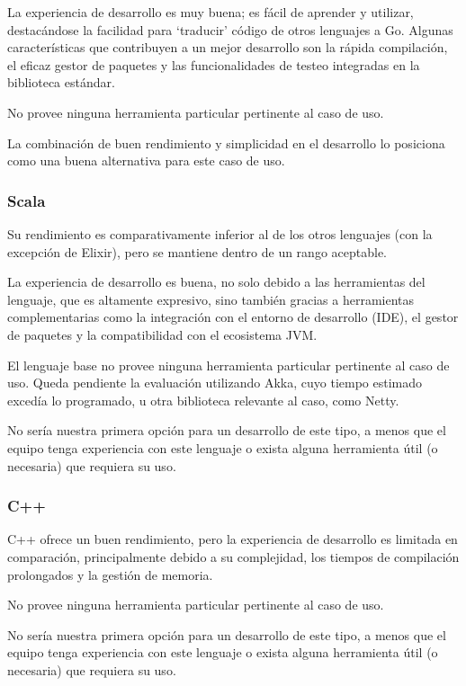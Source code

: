 \documentclass[11pt]{article}
\let\Oldsubsubsection\subsubsection
\renewcommand{\subsubsection}{\FloatBarrier\Oldsubsubsection}
\begin{document}
La experiencia de desarrollo es muy buena; es fácil de aprender y utilizar, destacándose la facilidad para `traducir' código de otros lenguajes a Go. Algunas características que contribuyen a un mejor desarrollo son la rápida compilación, el eficaz gestor de paquetes y las funcionalidades de testeo integradas en la biblioteca estándar.

No provee ninguna herramienta particular pertinente al caso de uso.

La combinación de buen rendimiento y simplicidad en el desarrollo lo posiciona como una buena alternativa para este caso de uso.

\subsubsection{Scala}

Su rendimiento es comparativamente inferior al de los otros lenguajes (con la excepción de Elixir), pero se mantiene dentro de un rango aceptable.

La experiencia de desarrollo es buena, no solo debido a las herramientas del lenguaje, que es altamente expresivo, sino también gracias a herramientas complementarias como la integración con el entorno de desarrollo (IDE), el gestor de paquetes y la compatibilidad con el ecosistema JVM.

El lenguaje base no provee ninguna herramienta particular pertinente al caso de uso. Queda pendiente la evaluación utilizando Akka, cuyo tiempo estimado excedía lo programado, u otra biblioteca relevante al caso, como Netty. 

No sería nuestra primera opción para un desarrollo de este tipo, a menos que el equipo tenga experiencia con este lenguaje o exista alguna herramienta útil (o necesaria) que requiera su uso.

\subsubsection{C++}

C++ ofrece un buen rendimiento, pero la experiencia de desarrollo es limitada en comparación, principalmente debido a su complejidad, los tiempos de compilación prolongados y la gestión de memoria.

No provee ninguna herramienta particular pertinente al caso de uso.

No sería nuestra primera opción para un desarrollo de este tipo, a menos que el equipo tenga experiencia con este lenguaje o exista alguna herramienta útil (o necesaria) que requiera su uso.
\end{document}
